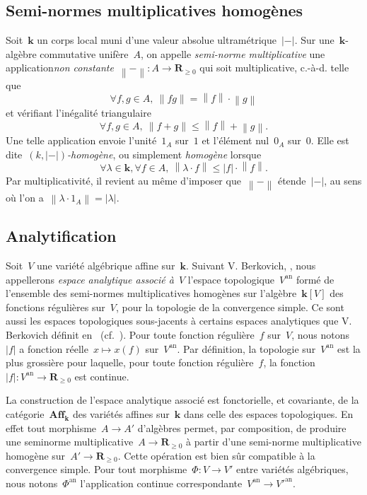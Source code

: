 \documentclass[french]{amsart}
\newcommand{\kk}{\mathbf{k}}
\newcommand{\abs}[1]{{\left|{#1}\right|}}
\newcommand{\an}{\textrm{an}}
\newcommand{\Nm}[1]{{\left\|{#1}\right\|}}
\newcommand{\R}{\mathbf{R}}
\newcommand{\Aff}{\mathbf{Aff}}
\begin{document}
\subsection{Semi-normes multiplicatives homogènes}\label{sectionD1}
Soit~$\kk$ un corps local muni
d'une valeur absolue ultramétrique~$\abs{-}$. Sur une~$\kk$-algèbre commutative unifère~$A$, on appelle \emph{semi-norme multiplicative} une application\emph{non constante}~$\Nm{-} : A \xrightarrow{} \R_{\geq 0}$ 
qui soit multiplicative, c.-à-d. telle que
\begin{equation}\label{eq24}
\forall f,g\in A,~\Nm{fg}=\Nm{f}\cdot\Nm{g}
\end{equation}
et vérifiant l'inégalité triangulaire
\begin{equation}\label{eq25}
\forall f,g\in A,~\Nm{f+g}\leq\Nm{f}+\Nm{g}.
\end{equation}
Une telle application envoie l'unité~$1_A$ sur~$1$ et l'élément nul~$0_A$ sur~$0$. Elle est dite~\emph{$(k,\abs{-})$-homogène}, ou simplement \emph{homogène} lorsque
\begin{equation}\label{eq26}
\forall\lambda\in\kk, \forall f\in A,~\Nm{\lambda\cdot f}\leq \abs{f}\cdot\Nm{f}.
\end{equation}
Par multiplicativité, il revient au même d'imposer que~$\Nm{-}$ étende~$\abs{-}$, au sens où l’on a~$\Nm{\lambda\cdot 1_A} = \abs{\lambda}$.

\subsection{Analytification}\label{sectionD2}
Soit~$V$ une variété algébrique affine sur~$\kk$. Suivant
V. Berkovich, \cite[1.5.1]{Ber90}, nous appellerons \emph{espace analytique associé à}~$V$ l'espace topologique~$V^\an$ formé de l'ensemble des semi-normes multiplicatives
homogènes sur l'algèbre~$\kk[V ]$ des fonctions régulières sur~$V$, pour la topologie de la convergence simple.
Ce sont aussi les espaces topologiques sous-jacents à certains espaces analytiques que V. Berkovich définit en~\cite[3.1]{Ber90} (cf.~\cite[3.4.2]{Ber90}). Pour toute fonction régulière~$f$ sur~$V$, nous notons~$\abs{f}$ a fonction réelle~$x\mapsto x(f)$ sur~$V^\an$.  Par définition, la topologie sur~$V^\an$ est la plus grossière pour laquelle, pour toute fonction régulière~$f$, la fonction~$\abs{f}:V^\an\rightarrow \R_{\geq0}$ est continue.

La construction de l'espace analytique associé est fonctorielle, et covariante,
de la catégorie~$\Aff_\kk$ des variétés affines sur~$\kk$ dans celle des espaces topologiques. En effet tout
morphisme~$A \to A'$ d'algèbres permet, par composition, de produire une seminorme multiplicative~$A \rightarrow \R_{\geq0}$ à partir d'une semi-norme multiplicative homogène sur~$A' \rightarrow \R_{\geq0}$. Cette opération est bien sûr compatible à la convergence simple.
Pour tout morphisme~$\Phi:V\rightarrow V'$ entre variétés algébriques, nous notons~$\Phi^\an$ l'application continue correspondante~$V^\an\rightarrow V'^\an$.
\end{document}
